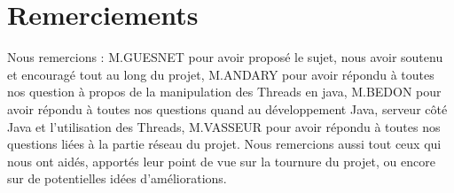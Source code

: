 \section*{Remerciements}

Nous remercions : \newline
	M.GUESNET pour avoir proposé le sujet, nous avoir soutenu et encouragé tout au long du projet,\newline
	M.ANDARY pour avoir répondu à toutes nos question à propos de la manipulation des Threads en java,\newline
	M.BEDON pour avoir répondu à toutes nos questions quand au développement Java, serveur côté Java et l'utilisation des Threads,\newline
	M.VASSEUR pour avoir répondu à toutes nos questions liées à la partie réseau du projet.\newline
	Nous remercions aussi tout ceux qui nous ont aidés, apportés leur point de vue sur la tournure du projet, ou encore sur de potentielles idées d'améliorations.
